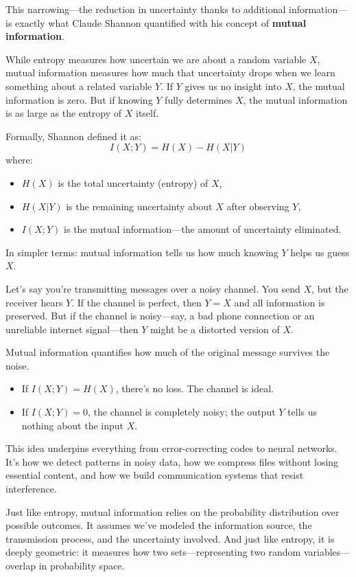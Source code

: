 This narrowing—the reduction in uncertainty thanks to additional information—is exactly what Claude Shannon quantified with his concept of \textbf{mutual information}.

While entropy measures how uncertain we are about a random variable \( X \), mutual information measures how much that uncertainty drops when we learn something about a related variable \( Y \). If \( Y \) gives us no insight into \( X \), the mutual information is zero. But if knowing \( Y \) fully determines \( X \), the mutual information is as large as the entropy of \( X \) itself.

Formally, Shannon defined it as:
\[
I(X; Y) = H(X) - H(X|Y)
\]
where:
\begin{itemize}
  \item \( H(X) \) is the total uncertainty (entropy) of \( X \),
  \item \( H(X|Y) \) is the remaining uncertainty about \( X \) after observing \( Y \),
  \item \( I(X; Y) \) is the mutual information—the amount of uncertainty eliminated.
\end{itemize}

In simpler terms: mutual information tells us how much knowing \( Y \) helps us guess \( X \).

Let’s say you’re transmitting messages over a noisy channel. You send \( X \), but the receiver hears \( Y \). If the channel is perfect, then \( Y = X \) and all information is preserved. But if the channel is noisy—say, a bad phone connection or an unreliable internet signal—then \( Y \) might be a distorted version of \( X \).

Mutual information quantifies how much of the original message survives the noise.

\begin{itemize}
  \item If \( I(X; Y) = H(X) \), there’s no loss. The channel is ideal.
  \item If \( I(X; Y) = 0 \), the channel is completely noisy; the output \( Y \) tells us nothing about the input \( X \).
\end{itemize}

This idea underpins everything from error-correcting codes to neural networks. It’s how we detect patterns in noisy data, how we compress files without losing essential content, and how we build communication systems that resist interference.

Just like entropy, mutual information relies on the probability distribution over possible outcomes. It assumes we’ve modeled the information source, the transmission process, and the uncertainty involved. And just like entropy, it is deeply geometric: it measures how two sets—representing two random variables—overlap in probability space.

